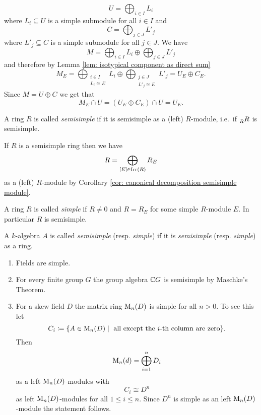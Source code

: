 \begin{rem}
\begin{enumerate}[label=\emph{\alph*)},leftmargin=*]
   \[
    U = \bigoplus_{i \in I} L_i
   \]
   where $L_i \subseteq U$ is a simple submodule for all $i \in I$ and
   \[
    C = \bigoplus_{j \in J} L'_j
   \]
   where $L'_j \subseteq C$ is a simple submodule for all $j \in J$. We have
   \[
    M = \bigoplus_{i \in I} L_i \oplus \bigoplus_{j \in J} L'_j
   \]
   and therefore by Lemma \ref{lem: isotypical component as direct sum}
   \[
    M_E
    = \bigoplus_{\substack{i \in I \\ L_i \cong E}} L_i \oplus \bigoplus_{\substack{j \in J \\ L'_j \cong E}} L'_j
    = U_E \oplus C_E.
   \]
   Since $M = U \oplus C$ we get that
   \[
    M_E \cap U = (U_E \oplus C_E) \cap U = U_E.
   \]
 \end{enumerate}
\end{rem}


\begin{defi}
 A ring $R$ is called \emph{semisimple} if it is semisimple as a (left) $R$-module, i.e.\ if $\prescript{}{R}{R}$ is semisimple.
\end{defi}


If $R$ is a semisimple ring then we have
\[
 R = \bigoplus_{[E] \in \operatorname{Irr}(R)} R_E
\]
as a (left) $R$-module by Corollary \ref{cor: canonical decomposition semisimple module}.


\begin{defi}
 A ring $R$ is called \emph{simple} if $R \neq 0$ and $R = R_E$ for some simple $R$-module $E$. In particular $R$ is semisimple.
\end{defi}


\begin{defi}
 A $k$-algebra $A$ is called \emph{semisimple} (resp. \emph{simple}) if it is \emph{semisimple} (resp. \emph{simple}) as a ring.
\end{defi}


\begin{expls}
 \begin{enumerate}[label=\emph{\alph*)},leftmargin=*]
  \item
   Fields are simple.
  \item
   For every finite group $G$ the group algebra $\mathbb{C} G$ is semisimple by Maschke’s Theorem.
  \item
   For a skew field $D$ the matrix ring $\operatorname{M}_n(D)$ is simple for all $n > 0$. To see this let
   \[
    C_i
    \coloneqq \{ A \in \operatorname{M}_n(D) \mid \text{ all except the $i$-th column are zero} \}.
   \]
   Then
   \[
    \operatorname{M}_n(d) = \bigoplus_{i=1}^n D_i
   \]
   as a left $\operatorname{M}_n(D)$-modules with
   \[
    C_i \cong D^n
   \]
   as left $\operatorname{M}_n(D)$-modules for all $1 \leq i \leq n$. Since $D^n$ is simple as an left $\operatorname{M}_n(D)$-module the statement follows.
 \end{enumerate}
\end{expls}


